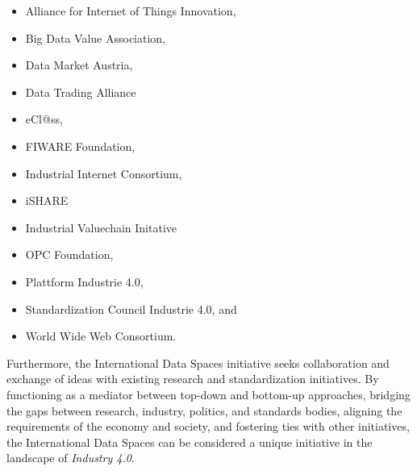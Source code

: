 \begin{itemize}
	\item Alliance for Internet of Things Innovation,

	\item Big Data Value Association,

	\item Data Market Austria,

	\item Data Trading Alliance

	\item eCl@ss,

	\item FIWARE Foundation,

	\item Industrial Internet Consortium,

	\item iSHARE

	\item Industrial Valuechain Initative

	\item OPC Foundation,

	\item Plattform Industrie 4.0,

	\item Standardization Council Industrie 4.0, and

	\item World Wide Web Consortium.
\end{itemize}



Furthermore, the International Data Spaces initiative seeks collaboration and exchange of ideas with existing research and standardization initiatives. By functioning as a mediator between top-down and bottom-up approaches, bridging the gaps between research, industry, politics, and standards bodies, aligning the requirements of the economy and society, and fostering ties with other initiatives, the International Data Spaces can be considered a unique initiative in the landscape of \textit{Industry 4.0}.
